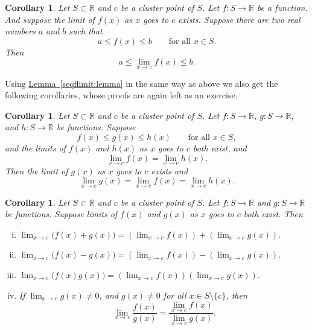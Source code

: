 \documentclass[12pt]{book}
\newcommand{\R}{{\mathbb{R}}}
\theoremstyle{plain}
\newtheorem{cor}[thm]{Corollary}
\theoremstyle{remark}
\theoremstyle{definition}
\theoremstyle{exercise}
\theoremstyle{example}
\newcommand{\lemmaref}[1]{\hyperref[#1]{Lemma~\ref*{#1}}}
\begin{document}
\begin{cor} \label{fconstineq:cor}
Let $S \subset \R$ and $c$ be a cluster point of $S$.  Let $f \colon S \to
\R$ be a function.  And suppose the limit of $f(x)$ as $x$ goes to $c$
exists.
Suppose there are two real numbers $a$ and $b$ such that
\begin{equation*}
a \leq f(x) \leq b \qquad \text{for all $x \in S$}.
\end{equation*}
Then
\begin{equation*}
a \leq \lim_{x\to c} f(x) \leq b .
\end{equation*}
\end{cor}

Using \lemmaref{seqflimit:lemma} in the same way as above we also get
the following corollaries, whose proofs are again left as an exercise.

\begin{cor} \label{fsqueeze:cor}
Let $S \subset \R$ and $c$ be a cluster point of $S$.  Let $f \colon S \to
\R$,
$g \colon S \to \R$, and $h \colon S \to \R$ be functions.  Suppose 
\begin{equation*}
f(x) \leq g(x) \leq h(x) \qquad \text{for all $x \in S$},
\end{equation*}
and the limits of $f(x)$ and $h(x)$ as $x$ goes to $c$ both exist, and
\begin{equation*}
\lim_{x\to c} f(x) = \lim_{x\to c} h(x) .
\end{equation*}
Then the limit of $g(x)$ as $x$ goes to $c$ exists and
\begin{equation*}
\lim_{x\to c} g(x) =
\lim_{x\to c} f(x) = \lim_{x\to c} h(x) .
\end{equation*}
\end{cor}

\begin{cor} \label{falg:cor}
Let $S \subset \R$ and $c$ be a cluster point of $S$.  Let $f \colon S \to
\R$ and
$g \colon S \to \R$ be functions. 
Suppose limits of $f(x)$ and $g(x)$ as $x$ goes to $c$ both exist.
Then
\begin{enumerate}[(i)]
\item
$\displaystyle
\lim_{x\to c} \bigl(f(x)+g(x)\bigr) = \left(\lim_{x\to c} f(x)\right) + 
\left(\lim_{x\to c} g(x)\right) .
$
\item
$\displaystyle
\lim_{x\to c} \bigl(f(x)-g(x)\bigr) = \left(\lim_{x\to c} f(x)\right) -
\left(\lim_{x\to c} g(x)\right) .
$
\item
$\displaystyle
\lim_{x\to c} \bigl(f(x)g(x)\bigr) = \left(\lim_{x\to c} f(x)\right)
\left(\lim_{x\to c} g(x)\right) .
$
\item \label{falg:cor:iv} If
$\displaystyle \lim_{x\to c} g(x) \not= 0$,
and $g(x) \not= 0$ for all $x \in S \setminus \{ c \}$, then
\begin{equation*}
\lim_{x\to c} \frac{f(x)}{g(x)} =
\frac{\lim_{x\to c} f(x)}{\lim_{x\to c} g(x)} .
\end{equation*}
\end{enumerate}
\end{cor}
\end{document}
